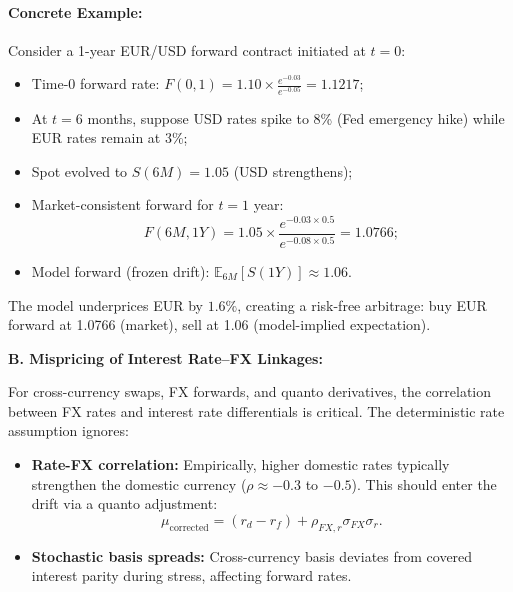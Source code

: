 \paragraph{Concrete Example:}
Consider a 1-year EUR/USD forward contract initiated at $t=0$:
\begin{itemize}
	\item Time-0 forward rate: $F(0,1) = 1.10 \times \frac{e^{-0.03}}{e^{-0.05}} = 1.1217$;
	\item At $t=6$ months, suppose USD rates spike to 8\% (Fed emergency hike) while EUR rates remain at 3\%;
	\item Spot evolved to $S(6M) = 1.05$ (USD strengthens);
	\item Market-consistent forward for $t=1$ year: 
	\begin{equation}
		F(6M, 1Y) = 1.05 \times \frac{e^{-0.03 \times 0.5}}{e^{-0.08 \times 0.5}} = 1.0766;
	\end{equation}
	\item Model forward (frozen drift): $\mathbb{E}_{6M}[S(1Y)] \approx 1.06$.
\end{itemize}
The model underprices EUR by $1.6\%$, creating a risk-free arbitrage: buy EUR forward at 1.0766 (market), sell at 1.06 (model-implied expectation).

\textbf{B. Mispricing of Interest Rate--FX Linkages:}

For cross-currency swaps, FX forwards, and quanto derivatives, the correlation between FX rates and interest rate differentials is critical. The deterministic rate assumption ignores:
\begin{itemize}
	\item \textbf{Rate-FX correlation:} Empirically, higher domestic rates typically strengthen the domestic currency ($\rho \approx -0.3$ to $-0.5$). This should enter the drift via a quanto adjustment:
	\begin{equation}
		\mu_{\text{corrected}} = (r_d - r_f) + \rho_{FX,r}\sigma_{FX}\sigma_r.
	\end{equation}
	\item \textbf{Stochastic basis spreads:} Cross-currency basis deviates from covered interest parity during stress, affecting forward rates.
\end{itemize}

